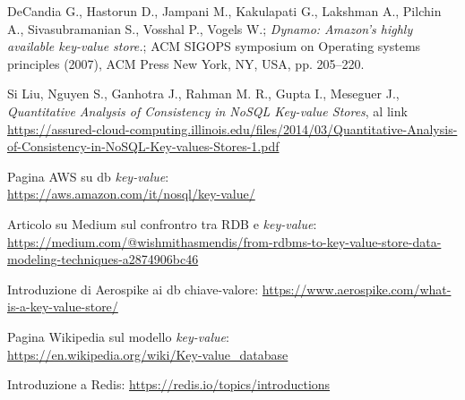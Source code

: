 \begin{thebibliography}{}
 DeCandia G., Hastorun D., Jampani M., Kakulapati G., Lakshman A., Pilchin A., Sivasubramanian S., Vosshal P., Vogels W.; \textit{Dynamo: Amazon’s highly available key-value store.}; ACM SIGOPS symposium on Operating systems principles (2007), ACM Press New York, NY, USA, pp. 205–220.

 Si Liu, Nguyen S., Ganhotra J., Rahman M. R.,
Gupta I., Meseguer J., \textit{Quantitative Analysis of Consistency
in NoSQL Key-value Stores}, al link \url{https://assured-cloud-computing.illinois.edu/files/2014/03/Quantitative-Analysis-of-Consistency-in-NoSQL-Key-values-Stores-1.pdf}

 Pagina AWS su db \textit{key-value}:\\ \url{https://aws.amazon.com/it/nosql/key-value/}

 Articolo su Medium sul confrontro tra RDB e \textit{key-value}:\\ \url{https://medium.com/@wishmithasmendis/from-rdbms-to-key-value-store-data-modeling-techniques-a2874906bc46}

 Introduzione di Aerospike ai db chiave-valore: \url{https://www.aerospike.com/what-is-a-key-value-store/}

 Pagina Wikipedia sul modello \textit{key-value}:\\ \url{https://en.wikipedia.org/wiki/Key-value_database}

 Introduzione a Redis: \url{https://redis.io/topics/introductions}

\end{thebibliography}